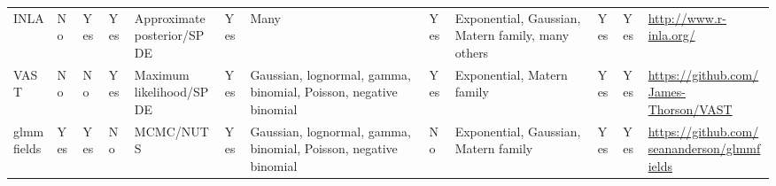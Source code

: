 \documentclass[12pt,english]{article}
\begin{document}
\begin{landscape}
\begin{table}
\begin{minipage}{\textwidth}
\begin{scriptsize}
\begin{tabular}{llllL{2cm}lL{2.4cm}lL{2.0cm}llL{2.0cm}}
        INLA     & No             & Yes     & Yes     & Approximate posterior/SPDE  & Yes        & Many                                                              & Yes      & Exponential, Gaussian, Matern family, many others & Yes                   & Yes       & \url{http://www.r-inla.org/}                                     \\
        VAST     & No             & No      & Yes     & Maximum likelihood/SPDE     & Yes        & Gaussian, lognormal, gamma, binomial, Poisson, negative binomial  & Yes      & Exponential, Matern family                                     & Yes                   & Yes        & \url{https://github.com/James-Thorson/VAST}                      \\
        glmmfields & Yes          & Yes     & No      & MCMC/NUTS                   & Yes        & Gaussian, lognormal, gamma, binomial, Poisson, negative binomial  & No       & Exponential, Gaussian, Matern family              & Yes                   & Yes       & \url{https://github.com/seananderson/glmmfields}                  \\
        \bottomrule
      \end{tabular}
    \end{scriptsize}
  \end{minipage}
  \end{table}
\end{landscape}

\clearpage
\linenumbers

\end{document}
